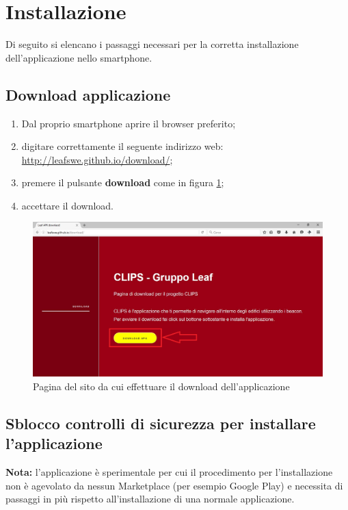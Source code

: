 \documentclass[../ClipsManualeUtente.tex]{subfiles}
\begin{document}
\section{Installazione}
	Di seguito si elencano i passaggi necessari per la corretta installazione dell'applicazione nello smartphone.
	

		\subsection{Download applicazione}
			\begin{enumerate}
				\item Dal proprio smartphone aprire il browser preferito;
				\item digitare correttamente il seguente indirizzo web: \\
					\url{http://leafswe.github.io/download/};
				\item premere il pulsante \textbf{download} come in figura \ref{fig:DownloadApplicazioneSito};
				\item accettare il download.
			\end{enumerate}
			
			\begin{figure} [h]
				\centering
				\includegraphics[width=\textwidth]{img/DownloadApplicazioneSito}
				\caption{Pagina del sito da cui effettuare il download dell'applicazione}
				\label{fig:DownloadApplicazioneSito}
			\end{figure}
		
		\newpage
		\subsection{Sblocco controlli di sicurezza per installare l'applicazione}
		
			\begin{framed}
				\textbf{Nota:} l'applicazione è sperimentale per cui il procedimento per l'installazione non è agevolato da nessun \gls{Marketplace} (per esempio \gls{Google} Play) e necessita di passaggi in più rispetto all'installazione di una normale applicazione.
			\end{framed}
		
\end{document}
